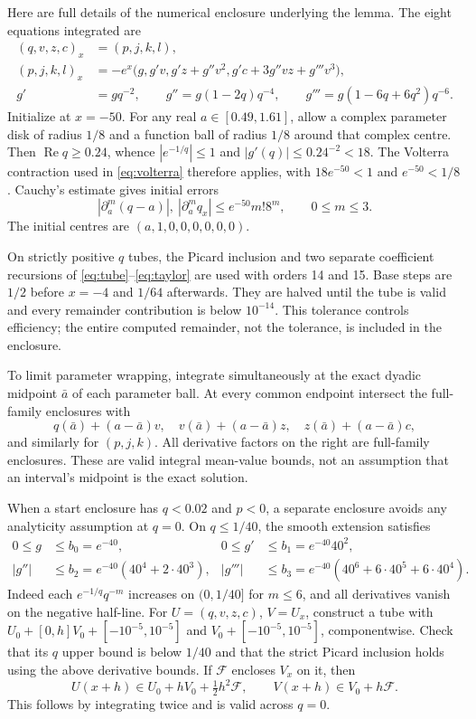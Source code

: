 \documentclass[11pt,a4paper]{report}
\begin{document}
Here are full details of the numerical enclosure underlying the lemma.
The eight equations integrated are
\begin{align*}
 (q,v,z,c)_x&=(p,j,k,l),\\
 (p,j,k,l)_x&=-e^x\bigl(g,g'v,g'z+g''v^2,
                         g'c+3g''vz+g'''v^3\bigr),\\
 g'&=gq^{-2},\qquad g''=g(1-2q)q^{-4},\qquad
 g'''=g(1-6q+6q^2)q^{-6}.
\end{align*}
Initialize at $x=-50$. For any real $a\in[0.49,1.61]$, allow a complex
parameter disk of radius $1/8$ and a function ball of radius $1/8$ around
that complex centre. Then $\operatorname{Re}q\geq0.24$, whence
$|e^{-1/q}|\leq1$ and $|g'(q)|\leq0.24^{-2}<18$.
The Volterra contraction used in \eqref{eq:volterra} therefore applies,
with $18e^{-50}<1$ and $e^{-50}<1/8$.
Cauchy's estimate gives initial errors
\begin{equation}\label{eq:reducedinit}
 |\partial_a^m(q-a)|,\ |\partial_a^m q_x|
 \leq e^{-50}m!8^m,\qquad 0\leq m\leq3.
\end{equation}
The initial centres are $(a,1,0,0,0,0,0,0)$.

On strictly positive $q$ tubes, the Picard inclusion and two separate
coefficient recursions of \eqref{eq:tube}--\eqref{eq:taylor} are used with
orders 14 and 15. Base steps are $1/2$ before $x=-4$ and $1/64$ afterwards.
They are halved until the tube is valid and every remainder contribution
is below $10^{-14}$. This tolerance controls efficiency; the entire
computed remainder, not the tolerance, is included in the enclosure.

To limit parameter wrapping, integrate simultaneously at the exact dyadic
midpoint $\bar a$ of each parameter ball. At every common endpoint intersect
the full-family enclosures with
\begin{equation}\label{eq:meanvalue}
 q(\bar a)+(a-\bar a)v,\quad
 v(\bar a)+(a-\bar a)z,\quad
 z(\bar a)+(a-\bar a)c,
\end{equation}
and similarly for $(p,j,k)$. All derivative factors on the right are
full-family enclosures. These are valid integral mean-value bounds, not
an assumption that an interval's midpoint is the exact solution.

When a start enclosure has $q<0.02$ and $p<0$, a separate enclosure avoids
any analyticity assumption at $q=0$. On $q\leq1/40$, the smooth extension
satisfies
\begin{align*}
 0\leq g&\leq b_0=e^{-40},&0\leq g'&\leq b_1=e^{-40}40^2,\\
 |g''|&\leq b_2=e^{-40}(40^4+2\cdot40^3),&
 |g'''|&\leq b_3=e^{-40}(40^6+6\cdot40^5+6\cdot40^4).
\end{align*}
Indeed each $e^{-1/q}q^{-m}$ increases on $(0,1/40]$ for $m\leq6$,
and all derivatives vanish on the negative half-line.
For $U=(q,v,z,c)$, $V=U_x$, construct a tube with
$U_0+[0,h]V_0+[-10^{-5},10^{-5}]$ and
$V_0+[-10^{-5},10^{-5}]$, componentwise. Check that its $q$ upper bound
is below $1/40$ and that the strict Picard inclusion holds using the above
derivative bounds. If $\mathcal F$ encloses $V_x$ on it, then
\[
 U(x+h)\in U_0+hV_0+\tfrac12h^2\mathcal F,\qquad
 V(x+h)\in V_0+h\mathcal F.
\]
This follows by integrating twice and is valid across $q=0$.
\end{document}
